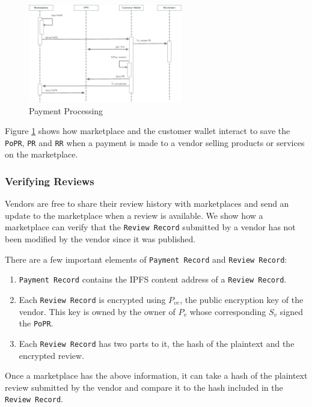 \documentclass[a4paper]{article}
\begin{document}
\begin{figure}
\centering
\includegraphics[width=0.6\textwidth]{../payment-processing.eps}
\caption{\label{fig:payment-processing}{Payment Processing}}
\end{figure}

Figure \ref{fig:payment-processing} shows how marketplace and the
customer wallet interact to save the \texttt{PoPR}, \texttt{PR} and
\texttt{RR} when a payment is made to a vendor selling products or
services on the marketplace.


\subsubsection{Verifying Reviews}

Vendors are free to share their review history with marketplaces and
send an update to the marketplace when a review is available. We show
how a marketplace can verify that the \texttt{Review Record} submitted
by a vendor has not been modified by the vendor since it was
published.

There are a few important elements of \texttt{Payment Record} and
\texttt{Review Record}:

\begin{enumerate}
\item \texttt{Payment Record} contains the IPFS content address of a
  \texttt{Review Record}.
  
\item Each \texttt{Review Record} is encrypted using $P_{ve}$, the
  public encryption key of the vendor. This key is owned by the owner
  of $P_v$ whose corresponding $S_v$ signed the \texttt{PoPR}.

\item Each \texttt{Review Record} has two parts to it, the hash of the
  plaintext and the encrypted review.
\end{enumerate}

Once a marketplace has the above information, it can take a hash of
the plaintext review submitted by the vendor and compare it to the
hash included in the \texttt{Review Record}.
\end{document}
